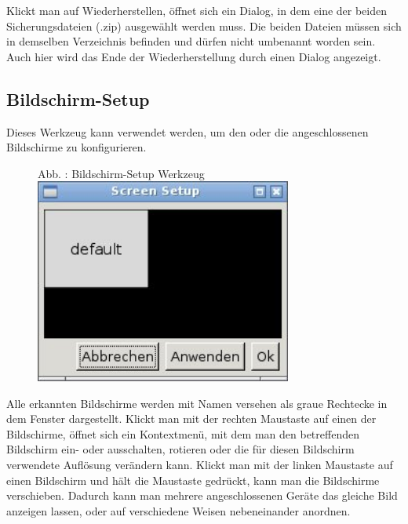 \documentclass[a4paper,12pt,twoside]{article}
\newcounter{Abb}
\renewcommand\theAbb{\arabic{Abb}}
\begin{document}
\bigskip

Klickt man auf {\textquotedbl}Wiederherstellen{\textquotedbl}, öffnet
sich ein Dialog, in dem eine der beiden Sicherungsdateien (.zip)
ausgewählt werden muss. Die beiden Dateien müssen sich in demselben
Verzeichnis befinden und dürfen nicht umbenannt worden sein. Auch hier
wird das Ende der Wiederherstellung durch einen Dialog angezeigt.


\bigskip

\subsection{Bildschirm-Setup}
Dieses Werkzeug kann verwendet werden, um den oder die angeschlossenen
Bildschirme zu konfigurieren.


\bigskip


\bigskip



\begin{figure}
\centering
\begin{minipage}{8.848cm}
Abb. \stepcounter{Abb}{\theAbb}: Bildschirm-Setup Werkzeug
\includegraphics[width=8.431cm,height=6.738cm]{efaLivede-img/efaLivede-img22.jpg}\end{minipage}
\end{figure}
Alle erkannten Bildschirme werden mit Namen versehen als graue Rechtecke
in dem Fenster dargestellt. Klickt man mit der rechten Maustaste auf
einen der Bildschirme, öffnet sich ein Kontextmenü, mit dem man den
betreffenden Bildschirm ein- oder ausschalten, rotieren oder die für
diesen Bildschirm verwendete Auflösung verändern kann. Klickt man mit
der linken Maustaste auf einen Bildschirm und hält die Maustaste
gedrückt, kann man die Bildschirme verschieben. Dadurch kann man
mehrere angeschlossenen Geräte das gleiche Bild anzeigen lassen, oder
auf verschiedene Weisen nebeneinander anordnen.
\end{document}
